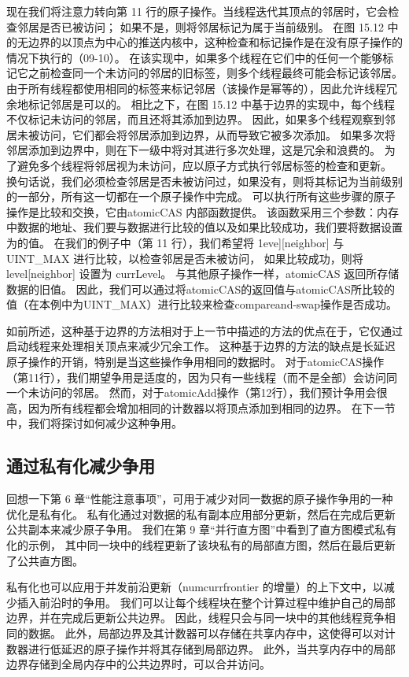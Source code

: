 现在我们将注意力转向第 11 行的原子操作。当线程迭代其顶点的邻居时，它会检查邻居是否已被访问； 
如果不是，则将邻居标记为属于当前级别。 
在图 15.12 中的无边界的以顶点为中心的推送内核中，这种检查和标记操作是在没有原子操作的情况下执行的（09-10）。 
在该实现中，如果多个线程在它们中的任何一个能够标记它之前检查同一个未访问的邻居的旧标签，则多个线程最终可能会标记该邻居。 
由于所有线程都使用相同的标签来标记邻居（该操作是幂等的），因此允许线程冗余地标记邻居是可以的。 
相比之下，在图 15.12 中基于边界的实现中，每个线程不仅标记未访问的邻居，而且还将其添加到边界。 
因此，如果多个线程观察到邻居未被访问，它们都会将邻居添加到边界，从而导致它被多次添加。 
如果多次将邻居添加到边界中，则在下一级中将对其进行多次处理，这是冗余和浪费的。 
为了避免多个线程将邻居视为未访问，应以原子方式执行邻居标签的检查和更新。 
换句话说，我们必须检查邻居是否未被访问过，如果没有，则将其标记为当前级别的一部分，所有这一切都在一个原子操作中完成。 
可以执行所有这些步骤的原子操作是比较和交换，它由atomicCAS 内部函数提供。 
该函数采用三个参数：内存中数据的地址、我们要与数据进行比较的值以及如果比较成功，我们要将数据设置为的值。 
在我们的例子中（第 11 行），我们希望将 1eve][neighbor] 与 UINT\_MAX 进行比较，以检查邻居是否未被访问，
如果比较成功，则将 level[neighbor] 设置为 currLevel。 与其他原子操作一样，atomicCAS 返回所存储数据的旧值。 
因此，我们可以通过将atomicCAS的返回值与atomicCAS所比较的值（在本例中为UINT\_MAX）进行比较来检查compareand-swap操作是否成功。

如前所述，这种基于边界的方法相对于上一节中描述的方法的优点在于，它仅通过启动线程来处理相关顶点来减少冗余工作。 
这种基于边界的方法的缺点是长延迟原子操作的开销，特别是当这些操作争用相同的数据时。 
对于atomicCAS操作（第11行），我们期望争用是适度的，因为只有一些线程（而不是全部）会访问同一个未访问的邻居。 
然而，对于atomicAdd操作（第12行），我们预计争用会很高，因为所有线程都会增加相同的计数器以将顶点添加到相同的边界。 
在下一节中，我们将探讨如何减少这种争用。

\subsection{通过私有化减少争用}
回想一下第 6 章“性能注意事项”，可用于减少对同一数据的原子操作争用的一种优化是私有化。 
私有化通过对数据的私有副本应用部分更新，然后在完成后更新公共副本来减少原子争用。 
我们在第 9 章“并行直方图”中看到了直方图模式私有化的示例，
其中同一块中的线程更新了该块私有的局部直方图，然后在最后更新了公共直方图。

私有化也可以应用于并发前沿更新（numcurrfrontier 的增量）的上下文中，以减少插入前沿时的争用。 
我们可以让每个线程块在整个计算过程中维护自己的局部边界，并在完成后更新公共边界。 
因此，线程只会与同一块中的其他线程竞争相同的数据。 
此外，局部边界及其计数器可以存储在共享内存中，这使得可以对计数器进行低延迟的原子操作并将其存储到局部边界。 
此外，当共享内存中的局部边界存储到全局内存中的公共边界时，可以合并访问。

